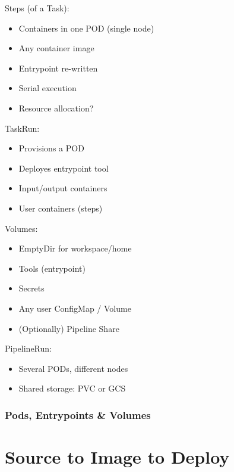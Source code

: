 \documentclass[aspectratio=169,11pt,hyperref={colorlinks=true}]{beamer}
\begin{document}
\begin{lblackrwhiteframe}
\begin{blackframe}
\begin{2columnsframe}
  {
  Steps (of a Task):
  \begin{itemize}
    \item Containers in one POD (single node)
    \item Any container image
    \item Entrypoint re-written
    \item Serial execution
    \item Resource allocation?
  \end{itemize}
  \vspace{3ex}
  TaskRun:
  \begin{itemize}
    \item Provisions a POD
    \item Deployes entrypoint tool
    \item Input/output containers
    \item User containers (steps)
  \end{itemize}
  }
  {
  Volumes:
  \begin{itemize}
    \item EmptyDir for workspace/home
    \item Tools (entrypoint)
    \item Secrets
    \item Any user ConfigMap / Volume
    \item (Optionally) Pipeline Share
  \end{itemize}
  \vspace{3ex}
  PipelineRun:
  \begin{itemize}
    \item Several PODs, different nodes
    \item Shared storage: PVC or GCS
  \end{itemize}
  }
  \frametitle{Pods, Entrypoints \& Volumes}
\end{2columnsframe}

\section{Source to Image to Deploy}


\end{blackframe}
\end{lblackrwhiteframe}
\end{document}
